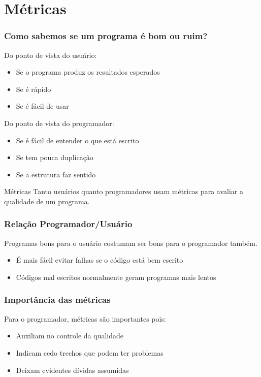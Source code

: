 \documentclass{beamer}
\begin{document}
\section{Métricas}
\begin{frame}
  \frametitle{Como sabemos se um programa é bom ou ruim?}
  Do ponto de vista do usuário:
  \begin{itemize}
    \item Se o programa produz os resultados esperados
    \item Se é rápido
    \item Se é fácil de usar
  \end{itemize}

  Do ponto de vista do programador:
  \begin{itemize}
    \item Se é fácil de entender o que está escrito
    \item Se tem pouca duplicação
    \item Se a estrutura faz sentido
  \end{itemize}

  \begin{block}{Métricas}
    Tanto usuários quanto programadores usam métricas para avaliar a qualidade de um programa.
  \end{block}
\end{frame}

\begin{frame}
  \frametitle{Relação Programador/Usuário}

  Programas bons para o usuário costumam ser bons para o programador também.
  \vspace{.75cm}
  \begin{itemize}
    \item É mais fácil evitar falhas se o código está bem escrito
    \vspace{.5cm}
    \item Códigos mal escritos normalmente geram programas mais lentos
  \end{itemize}
\end{frame}

\begin{frame}
  \frametitle{Importância das métricas}

  Para o programador, métricas são importantes pois:
  \vspace{.75cm}
  \begin{itemize}
    \item Auxiliam no controle da qualidade
    \vspace{.5cm}
    \item Indicam cedo trechos que podem ter problemas
    \vspace{.5cm}
    \item Deixam evidentes dívidas assumidas
  \end{itemize}
\end{frame}
\end{document}
